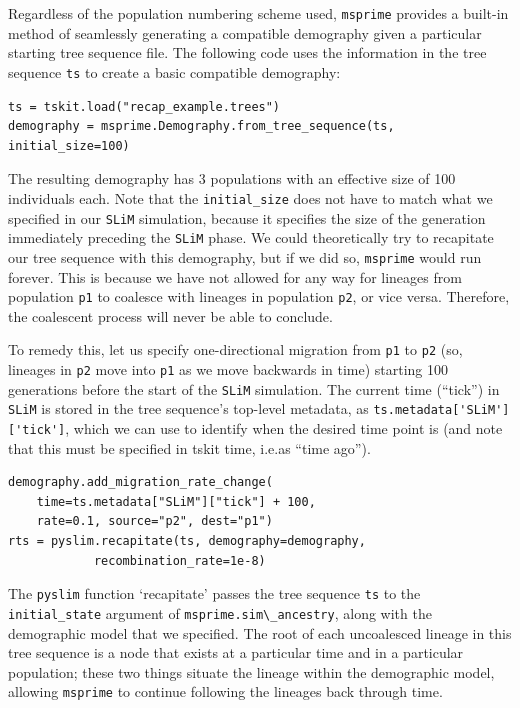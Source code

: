 \documentclass[12pt]{article}
\newcommand{\msprime}[0]{\texttt{msprime}\xspace}
\newcommand{\slim}[0]{\texttt{SLiM}\xspace}
\newcommand{\pyslim}[0]{\texttt{pyslim}\xspace}
\newcommand*{\ie}{i.e.\xcomma}
\newcommand{\p}[1]{\texttt{p#1}}
\begin{document}
Regardless of the population numbering scheme used, \msprime provides a built-in method of seamlessly generating a
compatible demography given a particular starting tree sequence file. The following code uses the information in the tree sequence \verb|ts|
to create a basic compatible demography:
\begin{verbatim}
ts = tskit.load("recap_example.trees")
demography = msprime.Demography.from_tree_sequence(ts, initial_size=100)
\end{verbatim}
The resulting demography has 3 populations with an effective size of 100 individuals each.
Note that the \verb|initial_size|
does not have to match what we specified in our \slim simulation, because it specifies the size of the generation
immediately preceding the \slim phase. We could theoretically try to recapitate our tree sequence with this
demography, but if we did so, \msprime would run forever. This is because we have not allowed for any way for
lineages from population \p1 to coalesce with lineages in population \p2, or vice versa.
Therefore, the coalescent process will never be able to conclude.

To remedy this,
let us specify one-directional migration from \p1 to \p2 (so, lineages in \p2 move into \p1 as we move backwards in time)
starting 100 generations before the start of the \slim simulation.
The current time (``tick'') in \slim is stored in the tree sequence's top-level metadata, as \verb|ts.metadata['SLiM']['tick']|,
which we can use to identify when the desired time point is
(and note that this must be specified in tskit time, \ie as ``time ago'').
\begin{verbatim}
demography.add_migration_rate_change(
    time=ts.metadata["SLiM"]["tick"] + 100,
    rate=0.1, source="p2", dest="p1")
rts = pyslim.recapitate(ts, demography=demography,
            recombination_rate=1e-8)
\end{verbatim}

The \pyslim function `recapitate' passes the tree sequence \verb|ts| to the
\verb|initial_state| argument of \verb|msprime.sim\_ancestry|,
along with the demographic model that we specified.
The root of each uncoalesced lineage in this tree sequence is a node
that exists at a particular time and in a particular population;
these two things situate the lineage within the demographic model,
allowing \msprime to continue following the lineages back through time.
\end{document}
